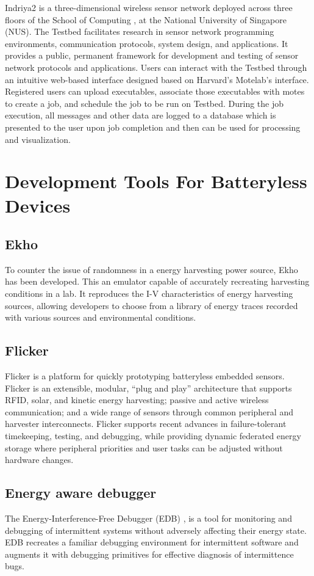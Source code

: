 Indriya2 \cite{indriya2} is a three-dimensional wireless sensor network deployed across three floors of the School of Computing , at the National University of Singapore (NUS). The Testbed facilitates research in sensor network programming environments, communication protocols, system design, and applications. It provides a public, permanent framework for development and testing of sensor network protocols and applications. Users can interact with the Testbed through an intuitive web-based interface designed based on Harvard's Motelab's interface. Registered users can upload executables, associate those executables with motes to create a job, and schedule the job to be run on Testbed. During the job execution, all messages and other data are logged to a database which is presented to the user upon job completion and then can be used for processing and visualization. 

\section{Development Tools For Batteryless Devices}

\subsection{Ekho}

To counter the issue of randomness in a energy harvesting power source, Ekho \cite{ekho} has been developed. This an emulator capable of accurately recreating harvesting conditions in a lab. It reproduces the I-V characteristics of energy harvesting sources, allowing developers to choose from a library of energy traces recorded with various sources and environmental conditions.

\subsection{Flicker}
Flicker \cite{flicker} is a platform for quickly prototyping batteryless embedded sensors. Flicker is an extensible, modular, “plug and play” architecture that supports RFID, solar, and kinetic energy harvesting; passive and active wireless communication; and a wide range of sensors through common peripheral and harvester interconnects. Flicker supports recent advances in failure-tolerant timekeeping, testing, and debugging, while providing dynamic federated energy storage where peripheral priorities and user tasks can be adjusted without hardware changes.

\subsection{Energy aware debugger}
The Energy-Interference-Free Debugger (EDB) \cite{edb}, is a tool for monitoring and debugging of intermittent systems without adversely affecting their energy state. EDB recreates a familiar debugging environment for intermittent software and augments it with debugging primitives for effective diagnosis of intermittence bugs.




